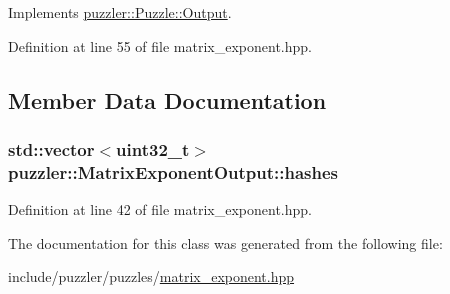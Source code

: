 Implements \hyperlink{a00023_a6f38b053870861fd4afe8819174c4d3d}{puzzler\+::\+Puzzle\+::\+Output}.



Definition at line 55 of file matrix\+\_\+exponent.\+hpp.



\subsection{Member Data Documentation}
\hypertarget{a00016_a9b891f8e2007f094085a8f41852e58b3}{}
\subsubsection[{hashes}]{\setlength{\rightskip}{0pt plus 5cm}std\+::vector$<$uint32\+\_\+t$>$ puzzler\+::\+Matrix\+Exponent\+Output\+::hashes}\label{a00016_a9b891f8e2007f094085a8f41852e58b3}


Definition at line 42 of file matrix\+\_\+exponent.\+hpp.



The documentation for this class was generated from the following file\+:\begin{DoxyCompactItemize}
\item 
include/puzzler/puzzles/\hyperlink{a00131}{matrix\+\_\+exponent.\+hpp}\end{DoxyCompactItemize}
